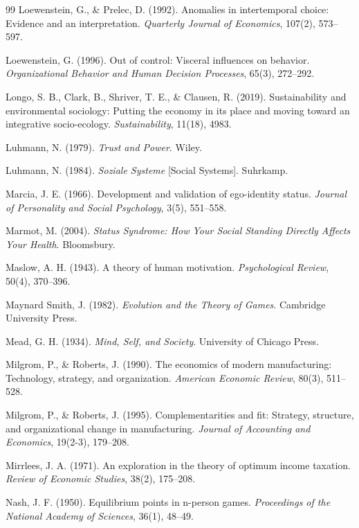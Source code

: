 \begin{thebibliography}{99}
Loewenstein, G., \& Prelec, D. (1992).
Anomalies in intertemporal choice: Evidence and an interpretation.
\textit{Quarterly Journal of Economics}, 107(2), 573--597.

Loewenstein, G. (1996).
Out of control: Visceral influences on behavior.
\textit{Organizational Behavior and Human Decision Processes}, 65(3), 272--292.

Longo, S. B., Clark, B., Shriver, T. E., \& Clausen, R. (2019).
Sustainability and environmental sociology: Putting the economy in its place and moving toward an integrative socio-ecology.
\textit{Sustainability}, 11(18), 4983.

Luhmann, N. (1979).
\textit{Trust and Power}.
Wiley.

Luhmann, N. (1984).
\textit{Soziale Systeme} [Social Systems].
Suhrkamp.

Marcia, J. E. (1966).
Development and validation of ego-identity status.
\textit{Journal of Personality and Social Psychology}, 3(5), 551--558.

Marmot, M. (2004).
\textit{Status Syndrome: How Your Social Standing Directly Affects Your Health}.
Bloomsbury.

Maslow, A. H. (1943).
A theory of human motivation.
\textit{Psychological Review}, 50(4), 370--396.

Maynard Smith, J. (1982).
\textit{Evolution and the Theory of Games}.
Cambridge University Press.

Mead, G. H. (1934).
\textit{Mind, Self, and Society}.
University of Chicago Press.

Milgrom, P., \& Roberts, J. (1990).
The economics of modern manufacturing: Technology, strategy, and organization.
\textit{American Economic Review}, 80(3), 511--528.

Milgrom, P., \& Roberts, J. (1995).
Complementarities and fit: Strategy, structure, and organizational change in manufacturing.
\textit{Journal of Accounting and Economics}, 19(2-3), 179--208.

Mirrlees, J. A. (1971).
An exploration in the theory of optimum income taxation.
\textit{Review of Economic Studies}, 38(2), 175--208.

Nash, J. F. (1950).
Equilibrium points in n-person games.
\textit{Proceedings of the National Academy of Sciences}, 36(1), 48--49.


\end{thebibliography}

